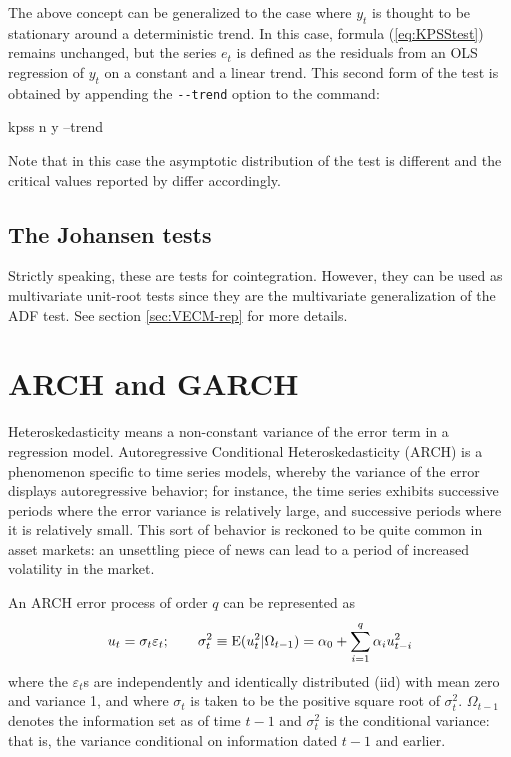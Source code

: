 The above concept can be generalized to the case where $y_t$ is
thought to be stationary around a deterministic trend. In this case,
formula (\ref{eq:KPSStest}) remains unchanged, but the series $e_t$ is
defined as the residuals from an OLS regression of $y_t$ on a constant
and a linear trend. This second form of the test is obtained by
appending the \verb|--trend| option to the  command:
\begin{code}
  kpss n y --trend
\end{code}
Note that in this case the asymptotic distribution of the test is
different and the critical values reported by  differ
accordingly.


\subsection{The Johansen tests}
\label{sec:Joh-test}

Strictly speaking, these are tests for cointegration. However, they
can be used as multivariate unit-root tests since they are the
multivariate generalization of the ADF test. See section
\ref{sec:VECM-rep} for more details.

\section{ARCH and GARCH}
\label{sec:arch-garch}

Heteroskedasticity means a non-constant variance of the error term in
a regression model.  Autoregressive Conditional Heteroskedasticity
(ARCH) is a phenomenon specific to time series models, whereby the
variance of the error displays autoregressive behavior; for instance,
the time series exhibits successive periods where the error variance
is relatively large, and successive periods where it is relatively
small.  This sort of behavior is reckoned to be quite common in asset
markets: an unsettling piece of news can lead to a period of increased
volatility in the market.

An ARCH error process of order $q$ can be represented as
\[
u_t = \sigma_t \varepsilon_t; \qquad
\sigma^2_t \equiv {\rm E}(u^2_t|\Omega_{t-1}) = 
\alpha_0 + \sum_{i=1}^q \alpha_i u^2_{t-i}
\]
where the $\varepsilon_t$s are independently and identically
distributed (iid) with mean zero and variance 1, and where $\sigma_t$
is taken to be the positive square root of $\sigma^2_t$.
$\Omega_{t-1}$ denotes the information set as of time $t-1$ and
$\sigma^2_t$ is the conditional variance: that is, the
variance conditional on information dated $t-1$ and earlier.

